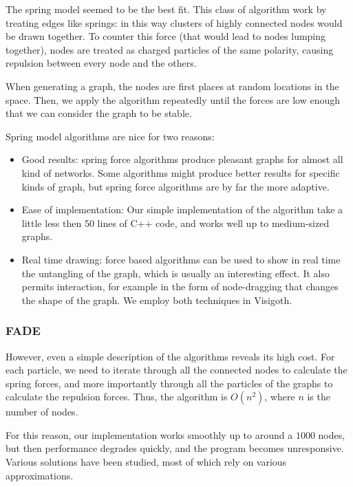 \documentclass[a4paper,11pt,titlepage]{article}
\begin{document}
The spring model seemed to be the best fit. This class of algorithm
work by treating edges like springs: in this way clusters of highly
connected nodes would be drawn together. To counter this force (that
would lead to nodes lumping together), nodes are treated as charged
particles of the same polarity, causing repulsion between every node
and the others.

When generating a graph, the nodes are first places at random
locations in the space. Then, we apply the algorithm repeatedly until
the forces are low enough that we can consider the graph to be stable.

Spring model algorithms are nice for two reasons:

\begin{itemize}
\item Good results: spring force algorithms produce pleasant graphs
  for almost all kind of networks. Some algorithms might produce
  better results for specific kinds of graph, but spring force
  algorithms are by far the more adaptive.

\item Ease of implementation: Our simple implementation of the
  algorithm take a little less then 50 lines of C++ code, and works
  well up to medium-sized graphs.

\item Real time drawing: force based algorithms can be used to show in
  real time the untangling of the graph, which is usually an
  interesting effect. It also permits interaction, for example in the
  form of node-dragging that changes the shape of the graph. We employ
  both techniques in Visigoth.
\end{itemize}

\subsubsection{FADE}

However, even a simple description of the algorithms reveals its high
cost. For each particle, we need to iterate through all the connected
nodes to calculate the spring forces, and more importantly through all
the particles of the graphs to calculate the repulsion forces. Thus,
the algorithm is \(O(n^2)\), where \(n\) is the number of nodes.

For this reason, our implementation works smoothly up to around a
\(1000\) nodes, but then performance degrades quickly, and the program
becomes unresponsive. Various solutions have been studied, most of
which rely on various approximations.
\end{document}
